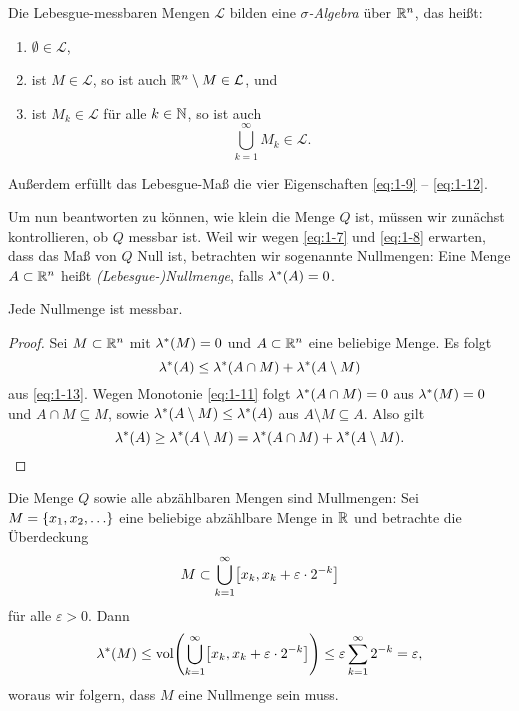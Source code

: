 \begin{proposition}
	Die Lebesgue-messbaren Mengen \(\mathcal{L}\) bilden eine \emph{\(\sigma\)-Algebra} über \(\R^n\), das heißt:
	\begin{enumerate}
		\item \(\emptyset \in \mathcal{L}\),
		\item ist \(M \in \mathcal{L}\), so ist auch \(\R^n \setminus M \in \mathcal{L}\), und
		\item ist \(M_k \in \mathcal{L}\) für alle \(k \in \N\), so ist auch
		\[
			\bigcup_{k = 1}^\infty M_k \in \mathcal{L}.
		\]
	\end{enumerate}
	Außerdem erfüllt das Lebesgue-Maß die vier Eigenschaften \eqref{eq:1-9} -- \eqref{eq:1-12}.
\end{proposition}

Um nun beantworten zu können, wie klein die Menge \(Q\) ist, müssen wir zunächst kontrollieren, ob \(Q\) messbar ist.
Weil wir wegen \eqref{eq:1-7} und \eqref{eq:1-8} erwarten, dass das Maß von \(Q\) Null ist, betrachten wir sogenannte Nullmengen:
Eine Menge \(A \subset \R^n\) heißt \emph{(Lebesgue-)Nullmenge}, falls \(\lambda^*\parentheses*{A} = 0\).

\begin{lemma}
	Jede Nullmenge ist messbar.
\end{lemma}

\begin{proof}
	Sei \(M \subset \R^n\) mit \(\lambda^*\parentheses*{M} = 0\) und \(A \subset \R^n\) eine beliebige Menge.
	Es folgt
	\[
		\lambda^*\parentheses*{A} \le \lambda^*\parentheses*{A \cap M} + \lambda^*\parentheses*{A \setminus M}
	\]
	aus \eqref{eq:1-13}.
	Wegen Monotonie \eqref{eq:1-11} folgt \(\lambda^*\parentheses*{A \cap M} = 0\) aus \(\lambda^*\parentheses*{M} = 0\) und \(A \cap M \subseteq M\), sowie \(\lambda^*\parentheses*{A \setminus M} \le \lambda^*\parentheses*{A}\) aus \(A \setminus M \subseteq A\).
	Also gilt
	\[
		\lambda^*\parentheses*{A} \ge \lambda^*\parentheses*{A \setminus M} = \lambda^*\parentheses*{A \cap M} + \lambda^*\parentheses*{A \setminus M}.
	\]
\end{proof}

\begin{example}
	Die Menge \(Q\) sowie alle abzählbaren Mengen sind Mullmengen:
	Sei \(M = \braces*{x_1, x_2, \ldots}\) eine beliebige abzählbare Menge in \(\R\) und betrachte die Überdeckung
	\[
		M \subset \bigcup_{k = 1}^\infty \brackets*{x_k, x_k + \varepsilon \cdot 2^{-k}}
	\]
	für alle \(\varepsilon > 0\).
	Dann
	\[
		\lambda^*\parentheses*{M} \le \vol\parentheses*{\bigcup_{k = 1}^\infty \brackets*{x_k, x_k + \varepsilon \cdot 2^{-k}}} \le \varepsilon\sum_{k = 1}^\infty 2^{-k} = \varepsilon,
	\]
	woraus wir folgern, dass \(M\) eine Nullmenge sein muss.
\end{example}


